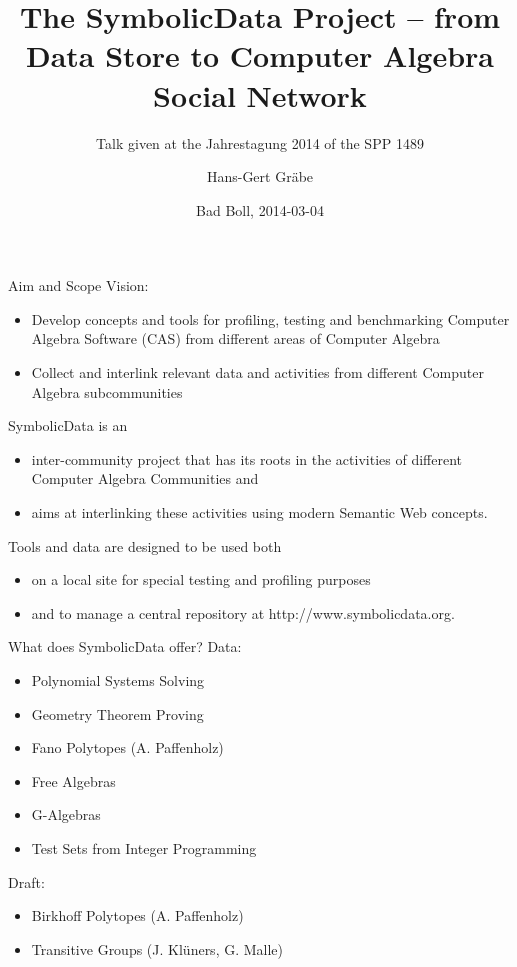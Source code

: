 \documentclass{beamer}
\title[The SymbolicData Project]{The SymbolicData Project -- from Data Store to
  Computer Algebra Social Network}
\subtitle{Talk given at the Jahrestagung 2014 of the SPP 1489}
\author[Hans-Gert Gr\"abe]{Hans-Gert Gr\"abe}
\institute[Uni Leipzig]{Leipzig University, Germany\\
\texttt{http://bis.informatik.uni-leipzig.de/HansGertGraebe}}
\date{Bad Boll, 2014-03-04}
\begin{document}
\begin{frame}
\maketitle
\end{frame}
\begin{frame}{Aim and Scope}{}
Vision:
\begin{itemize}
\item Develop concepts and tools for profiling, testing and benchmarking
  Computer Algebra Software (CAS) from different areas of Computer Algebra
\item Collect and interlink relevant data and activities from different
  Computer Algebra subcommunities
\end{itemize}
{SymbolicData is an}
\begin{itemize}
\item inter-community project that has its roots in the activities of
  different Computer Algebra Communities and
\item aims at interlinking these activities using modern Semantic Web
  concepts. 
\end{itemize}
{Tools and data are designed to be used both}
\begin{itemize}
\item on a local site for special testing and profiling purposes
\item and to manage a central repository at http://www.symbolicdata.org.
\end{itemize}
\end{frame}

\begin{frame}{What does SymbolicData offer?}{}
Data:
\begin{itemize}
\item Polynomial Systems Solving
\item Geometry Theorem Proving
\item Fano Polytopes (A. Paffenholz)
\item Free Algebras
\item G-Algebras
\item Test Sets from Integer Programming
\end{itemize}
{Draft:}
\begin{itemize}
\item Birkhoff Polytopes (A. Paffenholz)
\item Transitive Groups (J. Kl\"uners, G. Malle)
\end{itemize}
\end{frame}
\end{document}
